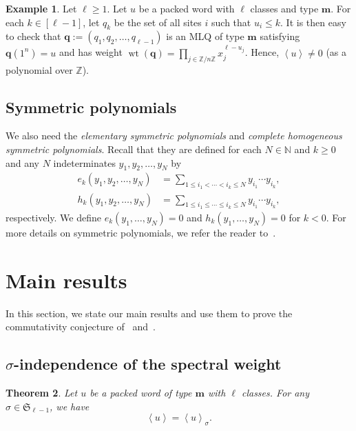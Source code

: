 \documentclass[reqno]{amsart}
\newcommand{\0}{\phantom{c}}
\newcommand{\swt}[1]{\left\langle #1 \right\rangle} %
\newcommand{\SymGp}[1]{\mathfrak{S}_{#1}} %
\DeclareMathOperator{\wt}{wt} %
\newcommand{\mm}{\mathbf{m}}
\newcommand{\qq}{\mathbf{q}}
\newcommand{\NN}{\mathbb{N}}
\newcommand{\ZZ}{\mathbb{Z}}
\let\sumnonlimits\sum
\let\prodnonlimits\prod
\renewcommand{\sum}{\sumnonlimits\limits}
\renewcommand{\prod}{\prodnonlimits\limits}
\newcommand{\tup}[1]{\left( #1 \right)}
\newcommand{\ive}[1]{\left[ #1 \right]}
\newcommand{\defn}[1]{{\color{darkred}\emph{#1}}} %
\theoremstyle{plain}
\newtheorem{thm}{Theorem}[section]
\theoremstyle{definition}
\newtheorem{example}[thm]{Example}
\numberwithin{equation}{section}
\begin{document}
\begin{example}
Let $\ell \geq 1$.
Let $u$ be a packed word with $\ell$ classes and type $\mm$.
For each $k \in \ive{\ell-1}$, let $q_k$ be the set of all sites $i$ such that $u_i \leq k$.
It is then easy to check that $\qq := \tup{q_1, q_2, \ldots, q_{\ell-1}}$ is an
MLQ of type $\mm$ satisfying $\qq(1^n) = u$ and has weight
$\wt(\qq) = \prod_{j \in \ZZ / n \ZZ} x_j^{\ell - u_j}$.
Hence, $\swt{u} \neq 0$ (as a polynomial over $\ZZ$).
\end{example}




\subsection{Symmetric polynomials}

We also need the \defn{elementary symmetric polynomials} and \defn{complete homogeneous symmetric polynomials}.
Recall that they are defined for each $N \in \NN$ and $k \geq 0$ and any $N$ indeterminates $y_1, y_2, \ldots, y_N$ by
\begin{align*}
e_k(y_1, y_2, \dotsc, y_N) & = \sum_{1 \leq i_1 < \cdots < i_k \leq N} y_{i_1} \dotsm y_{i_k},
\\ h_k(y_1, y_2, \dotsc, y_N) & = \sum_{1 \leq i_1 \leq \cdots \leq i_k \leq N} y_{i_1} \dotsm y_{i_k},
\end{align*}
respectively.
We define $e_k(y_1, \dotsc, y_N) = 0$ and $h_k(y_1, \dotsc, y_N) = 0$ for $k < 0$.
For more details on symmetric polynomials, we refer the reader to~\cite[Ch.~7]{Stanley-EC2}.








\section{Main results}
\label{sec:result}


In this section, we state our main results and use them to prove the commutativity conjecture of~\cite{AAMP} and~\cite[Conj.~3.10]{AasLin17}.

\subsection{\texorpdfstring{$\sigma$}{sigma}-independence of the spectral weight}

\begin{thm}
\label{thm:permutation}
  Let $u$ be a packed word of type $\mm$ with $\ell$ classes.
  For any $\sigma \in \SymGp{\ell-1}$, we have 
  \[
  \swt{u} = \swt{u}_{\sigma}.
  \]
\end{thm}
\end{document}

